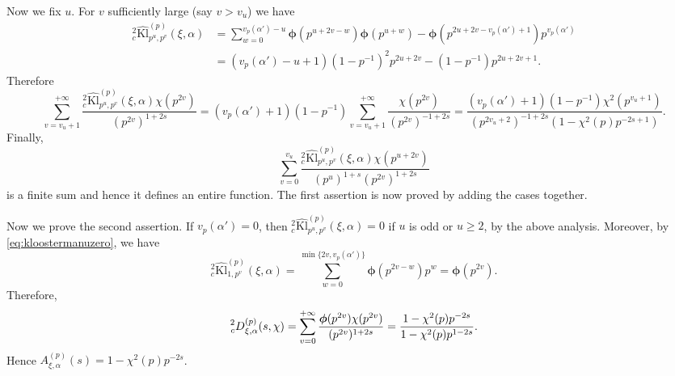 \documentclass[10pt,oneside,reqno]{amsart}
\makeatletter
\newcommand\Kl{\mathrm{Kl}}
\renewcommand\geq{\geqslant}
\theoremstyle{THEOREM}
\theoremstyle{DEFINITION}
\theoremstyle{EXERCISE}
\numberwithin{equation}{section}
\renewenvironment{proof}[1][\proofname]{\par
  \vspace{-6pt}
  \pushQED{\qed}
  \normalfont \topsep6\p@\@plus6\p@\relax
  \trivlist
  \item[\hskip\labelsep\rmfamily\bfseries
    #1\@addpunct{:}]\ignorespaces
}{
  \popQED\endtrivlist\@endpefalse
  \vspace{-6pt}
}
\makeatother
\begin{document}
\begin{proof}
Now we fix $u$. For $v$ sufficiently large (say $v>v_u$) we have
\begin{align*}
{}_c^2\widehat{\Kl}_{p^u,p^v}^{(p)}(\xi,\alpha)&=\sum_{w=0}^{v_p(\alpha')-u}\bm \phi(p^{u+2v-w}) \bm\phi(p^{u+w})-\bm\phi(p^{2u+2v-v_p(\alpha')+1})p^{v_p(\alpha')}\\
&=(v_p(\alpha')-u+1)(1-p^{-1})^2p^{2u+2v}-(1-p^{-1})p^{2u+2v+1}.
\end{align*}
Therefore 
\[
\sum_{v=v_u+1}^{+\infty}\frac{{}_c^2\widehat{\Kl}^{(p)}_{p^u,p^v}(\xi,\alpha) \chi(p^{2v})}{(p^{2v})^{1+2s}}=(v_p(\alpha')+1)(1-p^{-1})\sum_{v=v_u+1}^{+\infty} \frac{\chi(p^{2v})}{(p^{2v})^{-1+2s}}= \frac{(v_p(\alpha')+1)(1-p^{-1})\chi^2(p^{v_u+1})}{(p^{2v_u+2})^{-1+2s}(1-\chi^2(p)p^{-2s+1})}.
\]
Finally,
\[
\sum_{v=0}^{v_u}\frac{{}_c^2\widehat{\Kl}^{(p)}_{p^u,p^v}(\xi,\alpha)\chi(p^{u+2v})} {(p^u)^{1+s}(p^{2v})^ {1+2s}}
\]
is a finite sum and hence it defines an entire function.
The first assertion is now proved by adding the cases together.

Now we prove the second assertion. If $v_p(\alpha')=0$, then ${}_c^2\widehat{\Kl}_{p^u,p^v}^{(p)}(\xi,\alpha)=0$ if $u$ is odd or $u\geq 2$, by the above analysis. Moreover, by \eqref{eq:kloostermanuzero}, we have
\[
{}_c^2\widehat{\Kl}_{1,p^v}^{(p)}(\xi,\alpha)= \sum_{w=0}^{\min\{2v,v_p(\alpha')\}}\bm\phi(p^{2v-w})p^w=\bm\phi(p^{2v}).
\]
Therefore,
\[
\prescript{2}{c}D_{\xi,\alpha}^{(p)}(s,\chi)=\sum_{v=0}^{+\infty}\frac{\bm\phi(p^{2v})\chi(p^{2v})} {(p^{2v})^{1+2s}}=\frac{1-\chi^2(p)p^{-2s}}{1-\chi^2(p)p^{1-2s}}.
\]
Hence $A_{\xi,\alpha}^{(p)}(s)=1-\chi^2(p)p^{-2s}$.
\end{proof}
\end{document}
